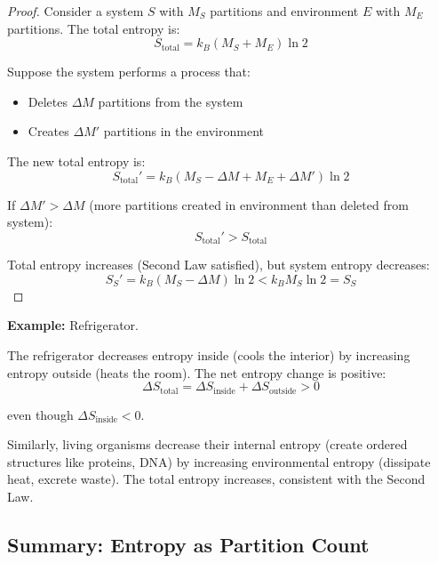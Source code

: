 \documentclass[twocolumn,10pt]{article}
\theoremstyle{definition}
\theoremstyle{remark}
\begin{document}
\begin{proof}
Consider a system $S$ with $M_S$ partitions and environment $E$ with $M_E$ partitions. The total entropy is:
\begin{equation}
S_{\text{total}} = k_B (M_S + M_E) \ln 2
\end{equation}

Suppose the system performs a process that:
\begin{itemize}
\item Deletes $\Delta M$ partitions from the system
\item Creates $\Delta M'$ partitions in the environment
\end{itemize}

The new total entropy is:
\begin{equation}
S_{\text{total}}' = k_B (M_S - \Delta M + M_E + \Delta M') \ln 2
\end{equation}

If $\Delta M' > \Delta M$ (more partitions created in environment than deleted from system):
\begin{equation}
S_{\text{total}}' > S_{\text{total}}
\end{equation}

Total entropy increases (Second Law satisfied), but system entropy decreases:
\begin{equation}
S_S' = k_B (M_S - \Delta M) \ln 2 < k_B M_S \ln 2 = S_S
\end{equation}
\end{proof}

\noindent\textbf{Example:} Refrigerator.

The refrigerator decreases entropy inside (cools the interior) by increasing entropy outside (heats the room). The net entropy change is positive:
\begin{equation}
\Delta S_{\text{total}} = \Delta S_{\text{inside}} + \Delta S_{\text{outside}} > 0
\end{equation}

even though $\Delta S_{\text{inside}} < 0$.

\vspace{0.2cm}
\noindent Similarly, living organisms decrease their internal entropy (create ordered structures like proteins, DNA) by increasing environmental entropy (dissipate heat, excrete waste). The total entropy increases, consistent with the Second Law.

\subsection{Summary: Entropy as Partition Count}
\end{document}
